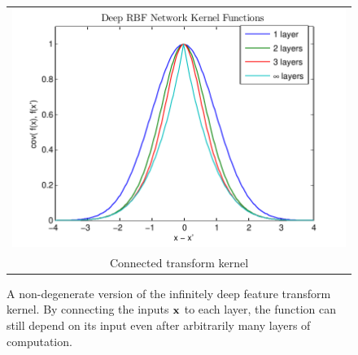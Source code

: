 \documentclass[twoside]{article}
\begin{document}

\begin{figure}[h]
\centering
\begin{tabular}{c}
\hspace{-0.5cm}\includegraphics[width=\columnwidth, clip, trim = 0cm 0cm 1cm 0.61cm]{figures/deep_kernel_connected} \\
Connected transform kernel
\end{tabular}
\caption{
A non-degenerate version of the infinitely deep feature transform kernel.  By connecting the inputs ${\bf{x}}$ to each layer, the function can still depend on its input even after arbitrarily many layers of computation.}
\label{fig:deep_kernel_connected}
\end{figure}
\end{document}
